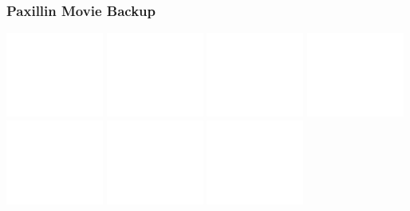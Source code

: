 \documentclass{beamer}
\begin{document}
\begin{frame}
	\frametitle{Paxillin Movie Backup}
	\begin{center}
	\includegraphics[width=0.24\textwidth]{figures/finding/movie_backup/01}
	\includegraphics[width=0.24\textwidth]{figures/finding/movie_backup/02}
	\includegraphics[width=0.24\textwidth]{figures/finding/movie_backup/03}
	\includegraphics[width=0.24\textwidth]{figures/finding/movie_backup/04}
	\\
	\includegraphics[width=0.24\textwidth]{figures/finding/movie_backup/05}
	\includegraphics[width=0.24\textwidth]{figures/finding/movie_backup/06}
	\includegraphics[width=0.24\textwidth]{figures/finding/movie_backup/07}

\end{center}
\end{frame}
\end{document}

